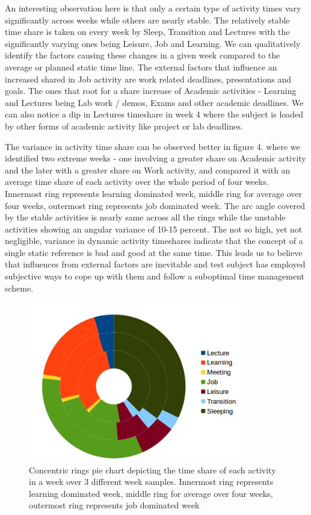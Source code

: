 \documentclass[conference]{IEEEtran}
\begin{document}
An interesting observation here is that only a certain type of activity times vary significantly across weeks while others are nearly stable. The relatively stable time share is taken on every week by Sleep, Transition and Lectures with the significantly varying ones being Leisure, Job and Learning. We can qualitatively identify the factors causing these changes in a given week compared to the average or planned static time line. The external factors that influence an increased shared in Job activity are work related deadlines, presentations and goals. The ones that root for a share increase of Academic activities - Learning and Lectures being Lab work / demos, Exams and other academic deadlines. We can also notice a dip in Lectures timeshare in week 4 where the subject is loaded by other forms of academic activity like project or lab deadlines. 

The variance in activity time share can be observed better in figure 4. where we identified two extreme weeks - one involving a greater share on Academic activity and the later with a greater share on Work activity, and compared it with an average time share of each activity over the whole period of four weeks. Innermost ring represents learning dominated week, middle ring for average over four weeks, outermost ring represents job dominated week. The arc angle covered by the stable activities is nearly same across all the rings while the unstable activities showing an angular variance of 10-15 percent. The not so high, yet not negligible, variance in dynamic activity timeshares indicate that the concept of a single static reference is bad and good at the same time. This leads us to believe that influences from external factors are inevitable and test subject has employed subjective ways to cope up with them and follow a suboptimal time management scheme.

\begin{figure}[hb]
  \centering
  \includegraphics[width=3.7in]{donut}
  \caption[]
   {Concentric rings pie chart depicting the time share of each activity in a week over 3 different week samples. Innermost ring represents learning dominated week, middle ring for average over four weeks, outermost ring represents job dominated week}
\end{figure}
\end{document}
